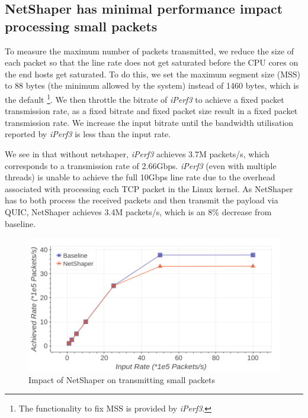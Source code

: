 \subsection{NetShaper has minimal performance impact processing small packets}
\label{subsec:netshaper-evaluation-num-packets}

To measure the maximum number of packets transmitted, we reduce the size of each packet so that the line rate does not get saturated before the CPU cores on the end hosts get saturated.
To do this, we set the maximum segment size (MSS) to 88 bytes (the minimum allowed by the system) instead of 1460 bytes, which is the default
\footnote{The functionality to fix MSS is provided by \textit{iPerf3}.}.
We then throttle the bitrate of \textit{iPerf3} to achieve a fixed packet transmission rate, as a fixed bitrate and fixed packet size result in a fixed packet transmission rate.
We increase the input bitrate until the bandwidth utilisation reported by \textit{iPerf3} is less than the input rate.

We see in  that without netshaper, \textit{iPerf3} achieves 3.7M packets/s, which corresponds to a transmission rate of 2.66Gbps.
\textit{iPerf3} (even with multiple threads) is unable to achieve the full 10Gbps line rate due to the overhead associated with processing each TCP packet in the Linux kernel.
As NetShaper has to both process the received packets and then transmit the payload via QUIC, NetShaper achieves 3.4M packets/s, which is an 8\% decrease from baseline.

\begin{figure}[!htb]
    \centering
    \includegraphics[width=\columnwidth]{figures/netshaper/evaluation/num_packets.png}
    \caption{Impact of NetShaper on transmitting small packets}
    \label{fig:netshaper-eval-num-packets}
\end{figure}